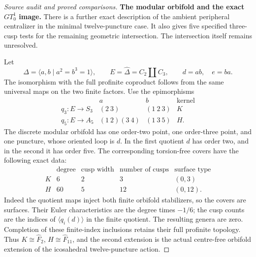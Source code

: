 \begin{proof}[Source audit and proved comparisons]
\medskip\noindent\textbf{The modular orbifold and the exact $GT_0^1$ image.}
There is a further exact description of the ambient peripheral
centralizer in the minimal twelve-puncture case.  It also gives
five specified three-cusp tests for the remaining geometric
intersection.  The intersection itself remains unresolved.

Let
\[
 \Delta=\langle a,b\mid a^2=b^3=1\rangle,
 \qquad E=\widehat\Delta=C_2\amalg C_3,
 \qquad d=ab,\quad e=ba.                                \tag{F.7.19}
\]
The isomorphism with the full profinite coproduct follows from
the same universal maps on the two finite factors.
Use the epimorphisms
\[
 \begin{array}{c|cc|c}
     &a&b&\text{kernel}\\ \hline
 q_3:E\to S_3 &(2\ 3)&(1\ 2\ 3)&K\\
 q_5:E\to A_5 &(1\ 2)(3\ 4)&(1\ 3\ 5)&H .
 \end{array}                                             \tag{F.7.20}
\]
The discrete modular orbifold has one order-two point,
one order-three point, and one puncture, whose oriented
loop is $d$.  In the first quotient $d$ has order two,
and in the second it has order five.  The corresponding
torsion-free covers have the following exact data:
\[
 \begin{array}{c|c|c|c|c}
  &\text{degree}&\text{cusp width}&\text{number of cusps}
        &\text{surface type}\\ \hline
  K&6&2&3&(0,3)\\
  H&60&5&12&(0,12).
 \end{array}                                             \tag{F.7.21}
\]
Indeed the quotient maps inject both finite orbifold
stabilizers, so the covers are surfaces.  Their Euler
characteristics are the degree times $-1/6$; the cusp
counts are the indices of $\langle q_i(d)\rangle$ in
the finite quotient.  The resulting genera are zero.
Completion of these finite-index inclusions retains their
full profinite topology.  Thus $K\cong\widehat F_2$,
$H\cong\widehat F_{11}$, and the second extension is
the actual centre-free orbifold extension of the
icosahedral twelve-puncture action.


\end{proof}
